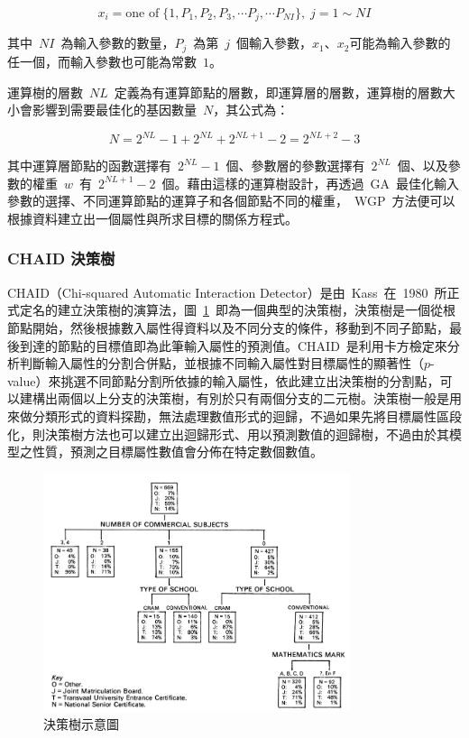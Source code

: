 \begin{equation} x_i = \text{one of}\; \{1, P_1, P_2, P_3, \cdots P_j, \cdots P_{NI}\},\; j = 1 \sim NI \label{eq:WGP-xi}\end{equation}

其中~$NI$~為輸入參數的數量，$P_j$~為第~$j$~個輸入參數，$x_1$、$x_2$可能為輸入參數的任一個，而輸入參數也可能為常數~$1$。

運算樹的層數~$NL$~定義為有運算節點的層數，即運算層的層數，運算樹的層數大小會影響到需要最佳化的基因數量~$N$，其公式為：

\begin{equation} N = 2^{NL} - 1 + 2^{NL} + 2^{NL + 1} - 2 = 2^{NL + 2} - 3  \label{eq:WGP-N}\end{equation}


其中運算層節點的函數選擇有~$2^{NL} - 1$~個、參數層的參數選擇有~$2^{NL}$~個、以及參數的權重~$w$~有~$2^{NL + 1} - 2$~個。藉由這樣的運算樹設計，再透過~GA~最佳化輸入參數的選擇、不同運算節點的運算子和各個節點不同的權重，~WGP~方法便可以根據資料建立出一個屬性與所求目標的關係方程式。


\subsubsection{CHAID 決策樹}

CHAID（Chi-squared Automatic Interaction Detector）是由~Kass\cite{kass1980exploratory}~在~1980~所正式定名的建立決策樹的演算法，圖~\ref{fig:Decision-Tree-sample}~即為一個典型的決策樹，決策樹是一個從根節點開始，然後根據數入屬性得資料以及不同分支的條件，移動到不同子節點，最後到達的節點的目標值即為此筆輸入屬性的預測值。CHAID~是利用卡方檢定來分析判斷輸入屬性的分割合併點，並根據不同輸入屬性對目標屬性的顯著性（$p$-value）來挑選不同節點分割所依據的輸入屬性，依此建立出決策樹的分割點，可以建構出兩個以上分支的決策樹，有別於只有兩個分支的二元樹。決策樹一般是用來做分類形式的資料探勘，無法處理數值形式的迴歸，不過如果先將目標屬性區段化，則決策樹方法也可以建立出迴歸形式、用以預測數值的迴歸樹，不過由於其模型之性質，預測之目標屬性數值會分佈在特定數個數值。

\begin{figure}[hbtp]
  \begin{center}
    \includegraphics[width=0.8\textwidth]{figures/decision-tree.pdf}
    \caption{決策樹示意圖} 
    \label{fig:Decision-Tree-sample}
  \end{center}
\end{figure}


